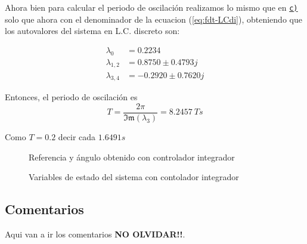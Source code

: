 Ahora bien para calcular el periodo de oscilación realizamos lo mismo que en \hyperref[pregunta-c]{\texttt{c)}} solo que ahora con el denominador de la ecuacion (\eqref{eq:fdt-LCdi}), obteniendo que los
autovalores del sistema en L.C. discreto son:

\begin{align*}
  \lambda_{0} &= 0.2234\\
  \lambda_{1,2} &= 0.8750 \pm 0.4793j\\
  \lambda_{3,4} &= -0.2920 \pm 0.7620j
\end{align*}


Entonces, el periodo de oscilación es
\begin{equation}
    T = \frac{2\pi}{\mathfrak{Im}(\lambda_{3})} = 8.2457\ \unit{T s} 
\end{equation}

Como $T= 0.2$ decir cada $1.6491 \unit{s}$ 


\begin{figure}[h]
    \centering
    
    \caption{Referencia y ángulo obtenido con controlador integrador}\label{fig:psi-int-disc}
  \end{figure}
  
  \begin{figure}[h]
    \centering
    
    \caption{Variables de estado del sistema con contolador integrador}\label{fig:estado-int-disc}
  \end{figure}
  
  \FloatBarrier


\subsection{Comentarios}

Aqui van a ir los comentarios \textbf{NO OLVIDAR!!}.
